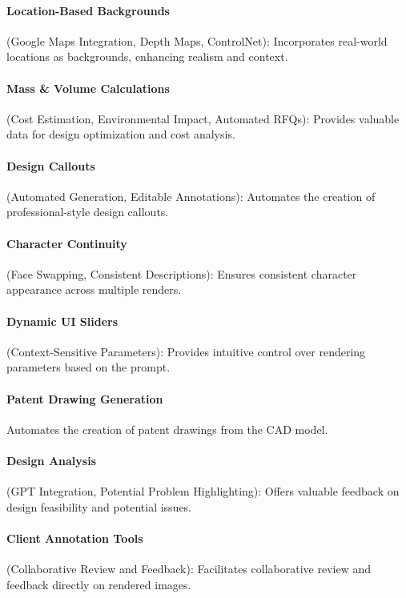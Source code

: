 \documentclass{article}
\begin{document}
\paragraph{Location-Based Backgrounds} (Google Maps Integration, Depth Maps, ControlNet): Incorporates real-world locations as backgrounds, enhancing realism and context.

\paragraph{Mass \& Volume Calculations} (Cost Estimation, Environmental Impact, Automated RFQs): Provides valuable data for design optimization and cost analysis.

\paragraph{Design Callouts} (Automated Generation, Editable Annotations): Automates the creation of professional-style design callouts.

\paragraph{Character Continuity} (Face Swapping, Consistent Descriptions): Ensures consistent character appearance across multiple renders.

\paragraph{Dynamic UI Sliders} (Context-Sensitive Parameters): Provides intuitive control over rendering parameters based on the prompt.

\paragraph{Patent Drawing Generation} Automates the creation of patent drawings from the CAD model.

\paragraph{Design Analysis} (GPT Integration, Potential Problem Highlighting): Offers valuable feedback on design feasibility and potential issues.

\paragraph{Client Annotation Tools} (Collaborative Review and Feedback): Facilitates collaborative review and feedback directly on rendered images.
\end{document}
